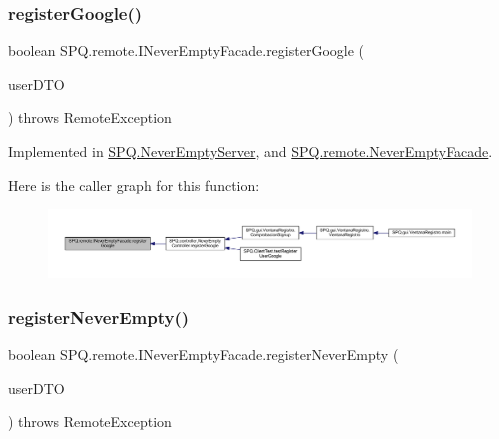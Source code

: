 \subsubsection{\texorpdfstring{register\+Google()}{registerGoogle()}}
{\footnotesize\ttfamily boolean S\+P\+Q.\+remote.\+I\+Never\+Empty\+Facade.\+register\+Google (\begin{DoxyParamCaption}\item[{\mbox{\hyperlink{class_s_p_q_1_1dto_1_1_user_d_t_o}{User\+D\+TO}}}]{user\+D\+TO }\end{DoxyParamCaption}) throws Remote\+Exception}



Implemented in \mbox{\hyperlink{class_s_p_q_1_1_never_empty_server_ac97355451c02fc378cb5d8f33f442ce6}{S\+P\+Q.\+Never\+Empty\+Server}}, and \mbox{\hyperlink{class_s_p_q_1_1remote_1_1_never_empty_facade_aaa8d4a6148957029af068d00da24890b}{S\+P\+Q.\+remote.\+Never\+Empty\+Facade}}.

Here is the caller graph for this function\+:
\nopagebreak
\begin{figure}[H]
\begin{center}
\leavevmode
\includegraphics[width=350pt]{interface_s_p_q_1_1remote_1_1_i_never_empty_facade_a93f3250c09a26fdb1d65219599dfd542_icgraph}
\end{center}
\end{figure}
\mbox{\label{interface_s_p_q_1_1remote_1_1_i_never_empty_facade_a7867e1e698fea32a535a1daeda4e8d6a}} 
\subsubsection{\texorpdfstring{register\+Never\+Empty()}{registerNeverEmpty()}}
{\footnotesize\ttfamily boolean S\+P\+Q.\+remote.\+I\+Never\+Empty\+Facade.\+register\+Never\+Empty (\begin{DoxyParamCaption}\item[{\mbox{\hyperlink{class_s_p_q_1_1dto_1_1_user_d_t_o}{User\+D\+TO}}}]{user\+D\+TO }\end{DoxyParamCaption}) throws Remote\+Exception}



